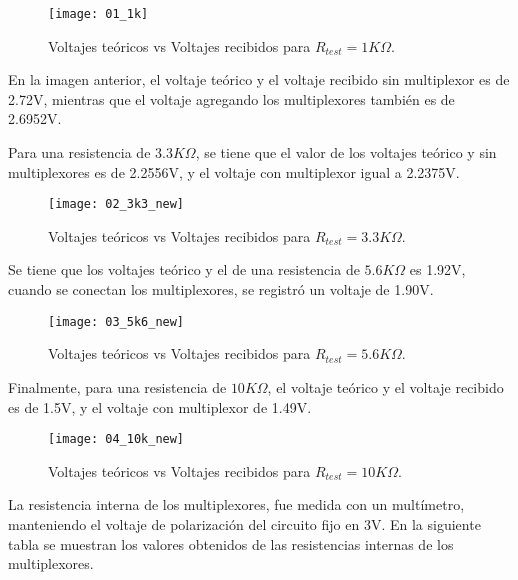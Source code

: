             \begin{figure}[hbtp]
                \centering
                \texttt{[image: 01\_1k]}
                \caption{Voltajes teóricos vs Voltajes recibidos para $R_{test} = 1K\Omega$.}
                \label{fig:01_1k}
            \end{figure}  
\newpage
En la imagen anterior, el voltaje teórico y el voltaje recibido sin multiplexor es de 2.72V, mientras que el voltaje agregando los multiplexores también es de 2.6952V.


Para una resistencia de $3.3K\Omega$, se tiene que el valor de los voltajes teórico y sin multiplexores es de 2.2556V, y el voltaje con multiplexor igual a 2.2375V.
            
            \begin{figure}[hbtp]
                \centering
                \texttt{[image: 02\_3k3\_new]}
                \caption{Voltajes teóricos vs Voltajes recibidos para $R_{test} = 3.3K\Omega$.}
                \label{fig:02_3k3_new}
            \end{figure}              

Se tiene que los voltajes teórico y el de una resistencia de $5.6K\Omega$ es 1.92V, cuando se conectan los multiplexores, se registró un voltaje de 1.90V.
 
            \begin{figure}[hbtp]
                \centering
                \texttt{[image: 03\_5k6\_new]}
                \caption{Voltajes teóricos vs Voltajes recibidos para $R_{test} = 5.6K\Omega$.}
                \label{fig:03_5k6_new}
            \end{figure}   
\newpage
Finalmente, para una resistencia de $10K\Omega$, el voltaje teórico y el voltaje recibido es de 1.5V, y el voltaje con multiplexor de 1.49V.

            \begin{figure}[hbtp]
                \centering
                \texttt{[image: 04\_10k\_new]}
                \caption{Voltajes teóricos vs Voltajes recibidos para $R_{test} = 10K\Omega$.}
                \label{fig:04_10k_new}
            \end{figure}  

La resistencia interna de los multiplexores, fue medida con un multímetro, manteniendo el voltaje de polarización del circuito fijo en 3V. En la siguiente tabla se muestran los valores obtenidos de las resistencias internas de los multiplexores.

